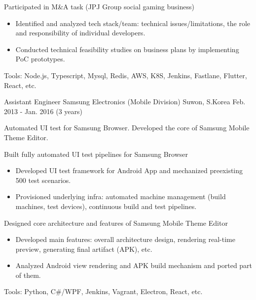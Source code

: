 \begin{cventries}
{\begin{cvitems}
        \item Participated in M\&A task (JPJ Group social gaming business)
        \begin{itemize}[leftmargin=2ex]
          \item Identified and analyzed tech stack/team: technical issues/limitations, the role and responsibility of individual developers.
          \item Conducted technical feasibility studies on business plans by implementing PoC prototypes.
        \end{itemize}
        \item Tools: Node.js, Typescript, Mysql, Redis, AWS, K8S, Jenkins, Fastlane, Flutter, React, etc.
      \end{cvitems}
    }

  \cventry
    {Assistant Engineer} %
    {Samsung Electronics (Mobile Division)} %
    {Suwon, S.Korea} %
    {Feb. 2013 - Jan. 2016 (3 years)} %
    {
      Automated UI test for Samsung Browser. Developed the core of Samsung Mobile Theme Editor.\newline
      \vspace{6mm}
      \begin{cvitems} %
        \item Built fully automated UI test pipelines for Samsung Browser
        \begin{itemize}[leftmargin=2ex]
          \item Developed UI test framework for Android App and mechanized preexisting 500 test scenarios.
          \item Provisioned underlying infra: automated machine management (build machines, test devices), continuous build and test pipelines.
        \end{itemize}
        \item Designed core architecture and features of Samsung Mobile Theme Editor
        \begin{itemize}[leftmargin=2ex]
          \item Developed main features: overall architecture design, rendering real-time preview, generating final artifact (APK), etc.
          \item Analyzed Android view rendering and APK build mechanism and ported part of them.
        \end{itemize}
        \item Tools: Python, C\#/WPF, Jenkins, Vagrant, Electron, React, etc.
      \end{cvitems}
    }

\end{cventries}
